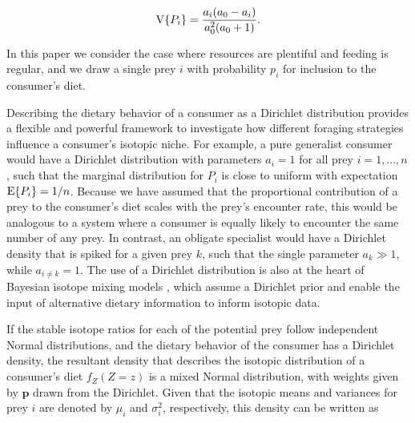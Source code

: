 \documentclass{frontiersSCNS}
\begin{document}
\begin{equation}
  \label{eqDirVar}
  {\rm V}\{P_i\} = \frac{a_i(a_0 - a_i)}{a_0^2(a_0 + 1)}.
\end{equation}

\noindent In this paper we consider the case where resources are plentiful and feeding is regular, and we draw a single prey $i$ with probability $p_i$ for inclusion to the consumer's diet.

Describing the dietary behavior of a consumer as a Dirichlet distribution provides a flexible and powerful framework to investigate how different foraging strategies influence a consumer's isotopic niche.
For example, a pure generalist consumer would have a Dirichlet distribution with parameters $a_i = 1$ for all prey $i=1,...,n$, such that the marginal distribution for $P_i$ is close to uniform with expectation ${\rm E}\{P_i\} = 1/n$.
Because we have assumed that the proportional contribution of a prey to the consumer's diet scales with the prey's encounter rate, this would be analogous to a system where a consumer is equally likely to encounter the same number of any prey.
In contrast, an obligate specialist would have a Dirichlet density that is spiked for a given prey $k$, such that the single parameter $a_k \gg 1$, while $a_{i \neq k} = 1$.
The use of a Dirichlet distribution is also at the heart of Bayesian isotope mixing models \citep{Moore:2008kg,Parnell:2010ub,Hopkins:2012dza,Parnell:2012wv}, which assume a Dirichlet prior and enable the input of alternative dietary information to inform isotopic data.



If the stable isotope ratios for each of the potential prey follow independent Normal distributions, and the dietary behavior of the consumer has a Dirichlet density, the resultant density that describes the isotopic distribution of a consumer's diet $f_Z(Z=z)$ is a mixed Normal distribution, with weights given by $\bm p$ drawn from the Dirichlet.
Given that the isotopic means and variances for prey $i$ are denoted by $\mu_i$ and $\sigma^2_i$, respectively, this density can be written as

\end{document}
